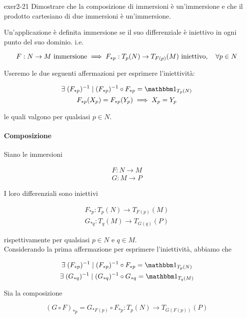 {exer2-21}
{
Dimostrare che la composizione di immersioni è un’immersione e che il prodotto cartesiano di due immersioni è un’immersione.
}
{
Un'applicazione è definita immersione se il suo differenziale è iniettivo in ogni punto del suo dominio. i.e.

\begin{equation}
	F : N \to M \text{ immersione} %
	\implies %
	F_{*p} : T_{p}(N) \to T_{F(p)}(M) \text{ iniettivo} \qcomma \forall p \in N
\end{equation}

Useremo le due seguenti affermazioni per esprimere l'iniettività:

\begin{gather}
	\E (F_{*p})^{-1} \mid (F_{*p})^{-1} \circ F_{*p} = \bigone_{T_{p}(N)} \\
	F_{*p}(X_{p}) = F_{*p}(Y_{p}) \implies X_{p} = Y_{p}
\end{gather}

le quali valgono per qualsiasi $ p \in N $.

\paragraph{Composizione}

Siano le immersioni

\begin{gather}
	F : N \to M \\
	G : M \to P
\end{gather}

I loro differenziali sono iniettivi

\begin{gather}
	F_{*p} : T_{p}(N) \to T_{F(p)}(M) \\
	G_{*q} : T_{q}(M) \to T_{G(q)}(P)
\end{gather}

rispettivamente per qualsiasi $ p \in N $ e $ q \in M $. \\
Considerando la prima affermazione per esprimere l'iniettività, abbiamo che

\begin{gather}
	\E (F_{*p})^{-1} \mid (F_{*p})^{-1} \circ F_{*p} = \bigone_{T_{p}(N)} \\
	\E (G_{*q})^{-1} \mid (G_{*q})^{-1} \circ G_{*q} = \bigone_{T_{q}(M)}
\end{gather}

Sia la composizione

\begin{equation}
	(G \circ F)_{*p} = G_{*F(p)} \circ F_{*p} : T_{p}(N) \to T_{G(F(p))}(P)
\end{equation}

}
